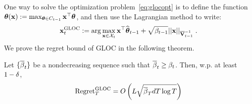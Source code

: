 One way to solve the optimization problem~\eqref{eq:glocopt} is to define the function ${{\boldsymbol \theta}}(\mathbf{x}) := \max_{{{\boldsymbol \theta}}\in C_{t-1}} \mathbf{x}^{\top}{{\boldsymbol \theta}}$, and then use the Lagrangian method to write:
\begin{equation}\begin{aligned}\label{eq:glocopt_ext}
  \mathbf{x}^{{\text{\normalfont GLOC}}}_t := \arg \max_{\mathbf{x}\in\mathcal{X}_t} \mathbf{x}^{\top}{{\widehat{\boldsymbol \theta}}}_{t-1} + \sqrt{\beta_{t-1}} ||\mathbf{x}||_{\overline{\mathbf{V}}^{-1}_{t-1}} \;.
\end{aligned}\end{equation}
We prove the regret bound of GLOC in the following theorem.
\begin{thm}  \label{thm:regret_o2cs}
  Let $\{{\overline{\beta}}_t\}$ be a nondecreasing sequence such that ${\overline{\beta}}_t\ge\beta_t$. Then, w.p. at least $1-{\delta}$,
  \[
    \textstyle    \normalfont{\text{Regret}}^{\emph{{\ensuremath{\text{\normalfont GLOC}}}}}_T = O\left( L\sqrt{{\overline{\beta}}_T dT\log T} \right)
  \]
\end{thm}
%
